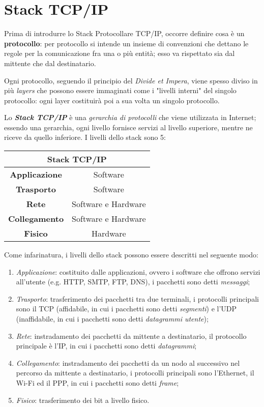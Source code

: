 \documentclass[a4paper]{article}
\begin{document}
\newpage


\section{Stack TCP/IP}

	Prima di introdurre lo Stack Protocollare TCP/IP, occorre definire cosa è un \textbf{protocollo}: per protocollo si intende un insieme di convenzioni che dettano le regole per la comunicazione fra una o più entità; esso va rispettato sia dal mittente che dal destinatario.
	
	Ogni protocollo, seguendo il principio del \emph{Divide et Impera}, viene spesso diviso in più \emph{layers} che possono essere immaginati come i "livelli interni" del singolo protocollo: ogni layer costituirà poi a sua volta un singolo protocollo.\newline
	
	Lo \textbf{\emph{Stack TCP/IP}} è una \emph{gerarchia di protocolli} che viene utilizzata in Internet; essendo una gerarchia, ogni livello fornisce servizi al livello superiore, mentre ne riceve da quello inferiore.
	I livelli dello stack sono 5:
	
	\begin{center}
		\begin{tabular}{cc}
			\multicolumn{2}{c}{Stack TCP/IP}\\
			\hline
			\textbf{Applicazione} & Software \\
			\textbf{Trasporto} & Software \\
			\textbf{Rete} & Software e Hardware \\
			\textbf{Collegamento} & Software e Hardware\\
			\textbf{Fisico} & Hardware \\
			\hline
		\end{tabular}
	\end{center}

	Come infarinatura, i livelli dello stack possono essere descritti nel seguente modo:
	\begin{enumerate}
		\item \emph{Applicazione}: costituito dalle applicazioni, ovvero i software che offrono servizi all'utente (e.g. HTTP, SMTP, FTP, DNS), i pacchetti sono detti \emph{messaggi};
		\item \emph{Trasporto}: trasferimento dei pacchetti tra due terminali, i protocolli principali sono il TCP (affidabile, in cui i pacchetti sono detti \emph{segmenti}) e l'UDP (inaffidabile, in cui i pacchetti sono detti \emph{datagrammi utente});
		\item \emph{Rete}: instradamento dei pacchetti da mittente a destinatario, il protocollo principale è l'IP, in cui i pacchetti sono detti \emph{datagrammi};
		\item \emph{Collegamento}: instradamento dei pacchetti da un nodo al successivo nel percorso da mittente a destinatario, i protocolli principali sono l'Ethernet, il Wi-Fi ed il PPP, in cui i pacchetti sono detti \emph{frame};
		\item \emph{Fisico}: trasferimento dei bit a livello fisico.
	\end{enumerate}
	
\end{document}
